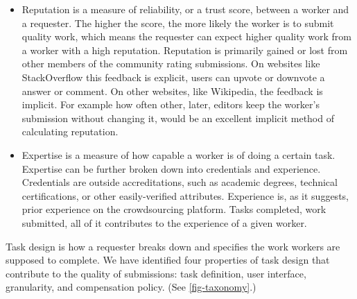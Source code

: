 \documentclass{sig-alternate-05-2015}
\begin{document}
	\begin{itemize}
	\item Reputation is a measure of reliability, or a trust score, between a worker and a requester. The higher the score, the more likely the worker is to submit quality work, which means the requester can expect higher quality work from a worker with a high reputation. Reputation is primarily gained or lost from other members of the community rating submissions. \cite{de2011reputation} On websites like StackOverflow this feedback is explicit, users can upvote or downvote a answer or comment. On other websites, like Wikipedia, the feedback is implicit. For example how often other, later, editors keep the worker's submission without changing it, would be an excellent implicit method of calculating reputation. 
	
	\item Expertise is a measure of how capable a worker is of doing a certain task. \cite{schall2012expert} Expertise can be further broken down into credentials and experience. Credentials are outside accreditations, such as academic degrees, technical certifications, or other easily-verified attributes. Experience is, as it suggests, prior experience on the crowdsourcing platform. Tasks completed, work submitted, all of it contributes to the experience of a given worker. 
	\end{itemize}

	Task design is how a requester breaks down and specifies the work workers are supposed to complete. We have identified four properties of task design that contribute to the quality of submissions: task definition, user interface, granularity, and compensation policy. (See \cref{fig-taxonomy}.)
	
\end{document}
